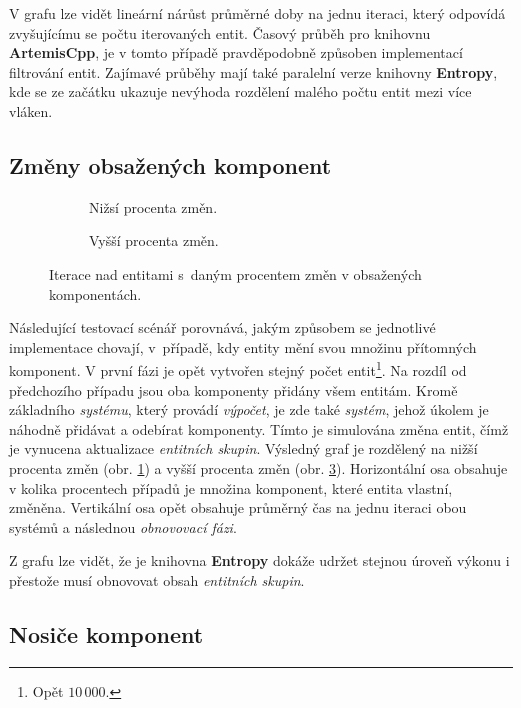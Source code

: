 V grafu lze vidět lineární nárůst průměrné doby na jednu iteraci, který odpovídá zvyšujícímu se počtu iterovaných entit. Časový průběh pro knihovnu \textbf{ArtemisCpp}, je v tomto případě pravděpodobně způsoben implementací filtrování entit. Zajímavé průběhy mají také paralelní verze knihovny \textbf{Entropy}, kde se ze začátku ukazuje nevýhoda rozdělení malého počtu entit mezi více vláken. 

\subsection{Změny obsažených komponent}

\begin{figure}[H]
	\centering
	\begin{subfigure}[b]{0.49\textwidth}
		\caption{Nižsí procenta změn.}\label{Fig:EVALAdvMovSysLow}
	\end{subfigure}
	\begin{subfigure}[b]{0.49\textwidth}
		\caption{Vyšší procenta změn.}\label{Fig:EVALAdvMovSysHigh}
	\end{subfigure}
	\caption{Iterace nad entitami s~daným procentem změn v obsažených komponentách.}
\end{figure}

Následující testovací scénář porovnává, jakým způsobem se jednotlivé implementace chovají, v~případě, kdy entity mění svou množinu přítomných komponent. V první fázi je opět vytvořen stejný počet entit\footnote{Opět $10\,000$.}. Na rozdíl od předchozího případu jsou oba komponenty přidány všem entitám. Kromě základního \emph{systému}, který provádí \emph{výpočet}, je zde také \emph{systém}, jehož úkolem je náhodně přidávat a odebírat komponenty. Tímto je simulována změna entit, čímž je vynucena aktualizace \emph{entitních skupin}. Výsledný graf je rozdělený na nižší procenta změn (obr. \ref{Fig:EVALAdvMovSysLow}) a vyšší procenta změn (obr. \ref{Fig:EVALAdvMovSysHigh}). Horizontální osa obsahuje v kolika procentech případů je množina komponent, které entita vlastní, změněna. Vertikální osa opět obsahuje průměrný čas na jednu iteraci obou systémů a následnou \emph{obnovovací fázi}.

Z grafu lze vidět, že je knihovna \textbf{Entropy} dokáže udržet stejnou úroveň výkonu i přestože musí obnovovat obsah \emph{entitních skupin}. 

\subsection{Nosiče komponent}

